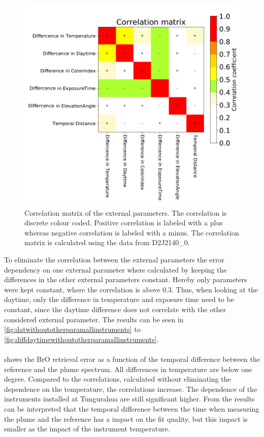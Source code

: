 \documentclass  [
  paper    = a4,
  BCOR     = 10mm,
  twoside,
  fontsize = 12pt,
  fleqn,
  toc      = bibnumbered,
  toc      = listofnumbered,
  numbers  = noendperiod,
  headings = normal,
  listof   = leveldown,
  version  = 3.03
]                                       {scrreprt}
\begin{document}
	\begin{figure}[h]
		\centering
		\includegraphics[width=1\linewidth]{Bilder/varCorrelation_matrix}
		\caption[Correlation matrix of the external parameters using the data from D2J2140\_0.]{Correlation matrix of the external parameters. The correlation is discrete colour coded. Positive correlation is labeled with a plus whereas negative correlation is labeled with a minus. The correlation matrix is calculated using the data from D2J2140\_0.}
		\label{fig:varcorrelationmatrix}
	\end{figure}
%
	To eliminate the correlation between the external parameters the   error dependency on one external parameter where calculated by keeping the differences in the other external parameters constant. Hereby only parameters were kept constant, where the correlation is above 0.3. Thus, when looking at the daytime, only the difference in temperature and exposure time need to be constant, since the daytime  difference does not correlate with the other considered external parameter. The results can be seen in \cref{fig:datwithoutotherparamallinstruments} to \cref{fig:diffdaytimewithoutotherparamallinstruments}.\\
	\\
	 shows the BrO retrieval error as a function of the temporal difference between the reference and the plume spectrum. All differences in temperature are below one degree. Compared to the correlations, calculated without eliminating the dependence on the temperature, the correlations increase. The dependence of the instruments installed at Tungurahua are still significant higher. From the results can be interpreted that the temporal difference between the time when measuring the plume and the reference has a impact on the fit quality, but this impact is smaller as the impact of the instrument temperature.\\
\end{document}
